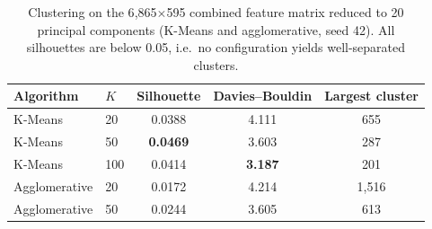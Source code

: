 \begin{table}[t]
\caption{Clustering on the 6{,}865$\times$595 combined feature matrix reduced to
20 principal components (K-Means and agglomerative, seed 42). All silhouettes are
below 0.05, i.e.\ no configuration yields well-separated clusters.}
\label{tab:clustering}
\centering
\footnotesize
\setlength{\tabcolsep}{4.5pt}
\begin{tabular}{@{}llccc@{}}
\toprule
\textbf{Algorithm} & \textbf{$K$} & \textbf{Silhouette} & \textbf{Davies--Bouldin} & \textbf{Largest cluster} \\
\midrule
K-Means        & 20  & 0.0388 & 4.111 & 655 \\
K-Means        & 50  & \textbf{0.0469} & 3.603 & 287 \\
K-Means        & 100 & 0.0414 & \textbf{3.187} & 201 \\
Agglomerative  & 20  & 0.0172 & 4.214 & 1{,}516 \\
Agglomerative  & 50  & 0.0244 & 3.605 & 613 \\
\bottomrule
\end{tabular}
\end{table}
